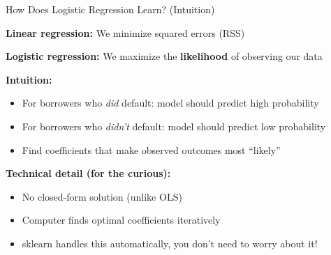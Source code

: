 \documentclass[10pt]{beamer}
\newcommand{\highlight}[1]{\textcolor{AccentOrange}{\textbf{#1}}}
\begin{document}
\begin{frame}{How Does Logistic Regression Learn? (Intuition)}

  \textbf{Linear regression:} We minimize squared errors (RSS)

  \vspace{0.5em}
  \textbf{Logistic regression:} We maximize the \highlight{likelihood} of observing our data

  \vspace{1em}
  \textbf{Intuition:}
  \begin{itemize}
    \item For borrowers who \textit{did} default: model should predict high probability
    \item For borrowers who \textit{didn't} default: model should predict low probability
    \item Find coefficients that make observed outcomes most ``likely''
  \end{itemize}

  \vspace{1em}
  \textbf{Technical detail (for the curious):}
  \begin{itemize}
    \item No closed-form solution (unlike OLS)
    \item Computer finds optimal coefficients iteratively
    \item sklearn handles this automatically, you don't need to worry about it!
  \end{itemize}
\end{frame}

\end{document}
